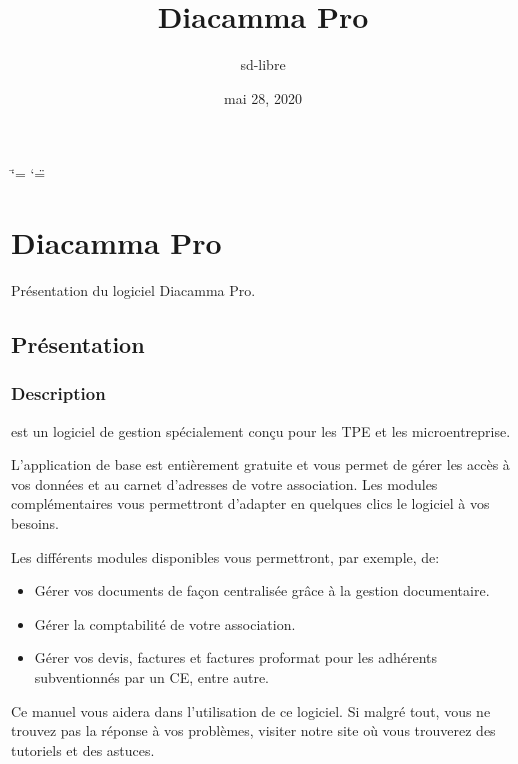\documentclass[a4paper,10pt,oneside,french]{sphinxmanual}
\title{Diacamma Pro}
\date{mai 28, 2020}
\author{sd-libre}
\begin{document}
\ifdefined\shorthandoff
  \ifnum\catcode`\=\string=\active\shorthandoff{=}\fi
  \ifnum\catcode`\"=\active{}\fi
\fi

\pagestyle{empty}
\sphinxmaketitle
\pagestyle{plain}
\sphinxtableofcontents
\pagestyle{normal}
\label{\detokenize{index::doc}}



\chapter{Diacamma Pro}
\label{\detokenize{pro/index:diacamma-pro}}\label{\detokenize{pro/index::doc}}
Présentation du logiciel Diacamma Pro.


\section{Présentation}
\label{\detokenize{pro/presentation:presentation}}\label{\detokenize{pro/presentation::doc}}

\subsection{Description}
\label{\detokenize{pro/presentation:description}}
 est un logiciel de gestion spécialement conçu pour les TPE et les micro\sphinxhyphen{}entreprise.

L’application de base est entièrement gratuite et vous permet de gérer les accès à vos données et au carnet d’adresses de votre association. Les modules complémentaires vous permettront d’adapter en quelques clics le logiciel à vos besoins.

Les différents modules disponibles vous permettront, par exemple, de:
\begin{itemize}
\item {} 
Gérer vos documents de façon centralisée grâce à la gestion documentaire.

\item {} 
Gérer la comptabilité de votre association.

\item {} 
Gérer vos devis, factures et factures proformat pour les adhérents subventionnés par un CE, entre autre.

\end{itemize}

Ce manuel vous aidera dans l’utilisation de ce logiciel.
Si malgré tout, vous ne trouvez pas la réponse à vos problèmes, visiter notre site  où vous trouverez des tutoriels et des astuces.
\end{document}
